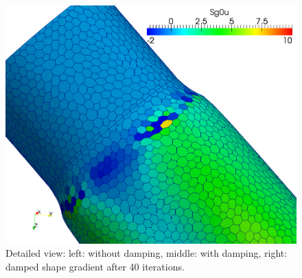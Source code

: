 \documentclass[oneside]{article}
\numberwithin{equation}{section}
\numberwithin{figure}{section}
\numberwithin{figure}{section}
\begin{document}
\begin{figure}[htbp]
    \includegraphics[scale=0.085]{Rohr3_damp40.png}
    \caption{Detailed view: left: without damping, middle: with damping, right: damped shape gradient after 40 iterations.}
\end{figure}
\end{document}
